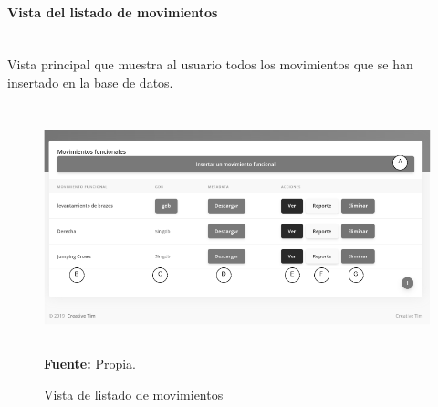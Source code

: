 \paragraph{Vista del listado de movimientos}\mbox{} \\ \label{ins:UI:web:index}
Vista principal que muestra al usuario todos los movimientos que se han insertado en la base de datos.
\begin{figure}[H]
	\caption{Vista de listado de movimientos}
	\label{fig:viewIndex}
	\centering
	\includegraphics[width=440px,height=270px]{graphics/web-index.PNG} \\
	\textbf{Fuente:} Propia.
\end{figure}
